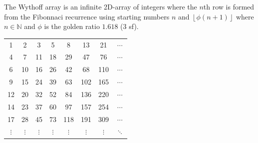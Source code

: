 \documentclass[addpoints]{exam}
\begin{document}
\begin{questions}
The Wythoff array is an infinite 2D-array of integers where the $n$th row is formed from the Fibonnaci recurrence using starting numbers $n$ and $\left \lfloor{\phi(n+1)}\right \rfloor$ where $n \in \mathbb{N}$ and $\phi$ is the golden ratio $1.618$ (3 sf).

\begin{center}
\begin{tabular}{c c c c c c c c}
 \color{blue}1 & 2 & 3 & 5 & 8 & 13 & 21 & $\cdots$\\
 4 & \color{blue}7 & 11 & 18 & 29 & 47 & 76 & $\cdots$\\
 6 & 10 & \color{blue}16 & 26 & 42 & 68 & 110 & $\cdots$\\
 9 & 15 & 24 & \color{blue}39 & 63 & 102 & 165 & $\cdots$ \\
 12 & 20 & 32 & 52 & \color{blue}84 & 136 & 220 & $\cdots$ \\
 14 & 23 & 37 & 60 & 97 & \color{blue}157 & 254 & $\cdots$\\
 17 & 28 & 45 & 73 & 118 & 191 & \color{blue}309 & $\cdots$\\
 $\vdots$ & $\vdots$ & $\vdots$ & $\vdots$ & $\vdots$ & $\vdots$ & $\vdots$ & \color{blue}$\ddots$\\
 

\end{tabular}
\end{center}


\end{questions}
\end{document}
